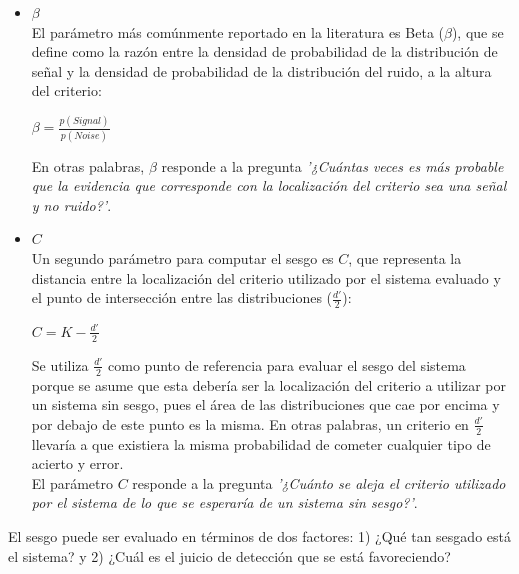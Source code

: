 \begin{itemize}
\begin{itemize}
\item \underline{$\beta$}\\

El parámetro más comúnmente reportado en la literatura es Beta ($\beta$), que se define como la razón entre la densidad de probabilidad de la distribución de señal y la densidad de probabilidad de la distribución del ruido, a la altura del criterio: \\

\begin{center}
$\beta = \frac{p(Signal)}{p(Noise)}$ \\
\end{center}

En otras palabras, $\beta$ responde a la pregunta \textit{'¿Cuántas veces es más probable que la evidencia que corresponde con la localización del criterio sea una señal y no ruido?'}.

\item \underline{$C$}\\

Un segundo parámetro para computar el sesgo es $C$, que representa la distancia entre la localización del criterio utilizado por el sistema evaluado y el punto de intersección entre las distribuciones ($\frac{d'}{2}$):\\

\begin{center}
$C =  K - \frac{d'}{2}$ \\
\end{center}

Se utiliza $\frac{d'}{2}$ como punto de referencia para evaluar el sesgo del sistema porque se asume que esta debería ser la localización del criterio a utilizar por un sistema sin sesgo, pues el área de las distribuciones que cae por encima y por debajo de este punto es la misma. En otras palabras, un criterio en $\frac{d'}{2}$ llevaría a que existiera la misma probabilidad de cometer cualquier tipo de acierto y error.\\

El parámetro $C$ responde a la pregunta \textit{'¿Cuánto se aleja el criterio utilizado por el sistema de lo que se esperaría de un sistema sin sesgo?'}.\\

\end{itemize}

El sesgo puede ser evaluado en términos de dos factores: 1) ¿Qué tan sesgado está el sistema? y 2) ¿Cuál es el juicio de detección que se está favoreciendo?\\


\end{itemize}
